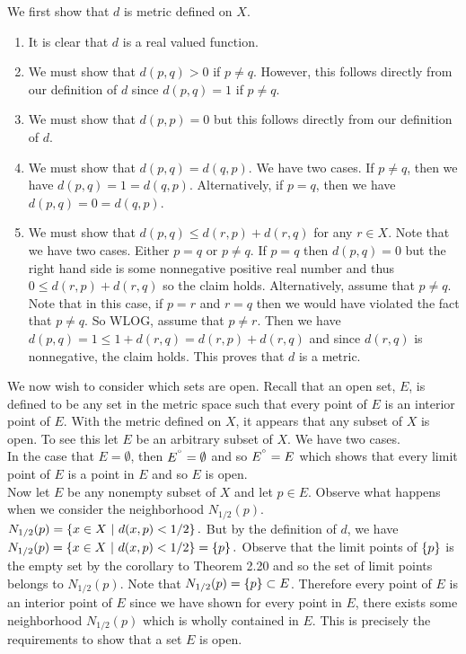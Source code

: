 \documentclass[12pt]{article}
\begin{document}
We first show that $d$ is metric defined on $X$.
\begin{enumerate}
\item It is clear that $d$ is a real valued function.
\item We must show that $d(p,q)>0$ if $p \neq q$. However, this follows directly from our definition of $d$ since $d(p,q)=1$ if $p \neq q$.
\item We must show that $d(p,p)=0$ but this follows directly from our definition of $d$.
\item We must show that $d(p,q)=d(q,p)$. We have two cases. If $p \neq q$, then we have $d(p,q)=1=d(q,p)$. Alternatively, if $p=q$, then we have $d(p,q)=0=d(q,p)$.
\item We must show that $d(p,q) \leq d(r,p)+d(r,q)$ for any $r \in X$. Note that we have two cases. Either $p=q$ or $p \neq q$. If $p=q$ then $d(p,q)=0$ but the right hand side is some nonnegative positive real number and thus $0 \leq d(r,p)+d(r,q)$ so the claim holds. Alternatively, assume that $p \neq q$. Note that in this case, if $p=r$ and $r=q$ then we would have violated the fact that $p \neq q$. So WLOG, assume that $p \neq r$. Then we have $d(p,q) = 1 \leq 1+d(r,q) = d(r,p)+d(r,q)$ and since $d(r,q)$ is nonnegative, the claim holds. This proves that $d$ is a metric. \\ 

\end{enumerate}

We now wish to consider which sets are open. Recall that an open set, $E$, is defined to be any set in the metric space such that every point of $E$ is an interior point of $E$. With the metric defined on $X$, it appears that any subset of $X$ is open. To see this let $E$ be an arbitrary subset of $X$. We have two cases. \\ 

In the case that $E= \emptyset$, then $E^{\degree} = \emptyset$ and so $E^{\degree}=E$ which shows that every limit point of $E$ is a point in $E$ and so $E$ is open. \\

Now let $E$ be any nonempty subset of $X$ and let $p \in E$. Observe what happens when we consider the neighborhood $N_{1/2}(p)$. $N_{1/2}(p)= \left\{x \in X ~|~d(x,p) < 1/2\right\}.$ But by the definition of $d$, we have $N_{1/2}(p)= \left\{x \in X ~|~d(x,p) < 1/2\right\} = \left\{p\right\}.$ Observe that the limit points of $\left\{p\right\}$ is the empty set by the corollary to Theorem 2.20 and so the set of limit points belongs to $N_{1/2}(p)$. Note that $N_{1/2}(p) = \left\{p\right\} \subset E$. Therefore every point of $E$ is an interior point of $E$ since we have shown for every point in $E$, there exists some neighborhood $N_{1/2}(p)$ which is wholly contained in $E$. This is precisely the requirements to show that a set $E$ is open. \\ 
\end{document}

